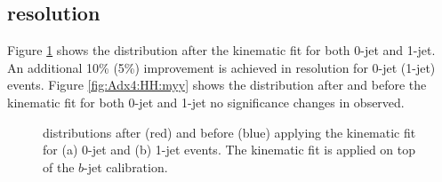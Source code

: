 \subsection{\mbb resolution}

Figure \ref{fig:Adx4:HH:mbb} shows the \mbb distribution after the kinematic fit for both 0-jet and 1-jet. An additional 10\% (5\%) improvement is achieved in \mbb resolution for 0-jet (1-jet) events. Figure \ref{fig:Adx4:HH:myy} shows the \myy distribution after and before the kinematic fit for both 0-jet and 1-jet no significance changes in observed.
\begin{figure}[htbp]
   \centering
   \caption{\mbb distributions after (red) and before (blue) applying the kinematic fit for (a) 0-jet and (b) 1-jet events. The kinematic fit is applied on top of the $b$-jet calibration.}
   \label{fig:Adx4:HH:mbb}
\end{figure}

